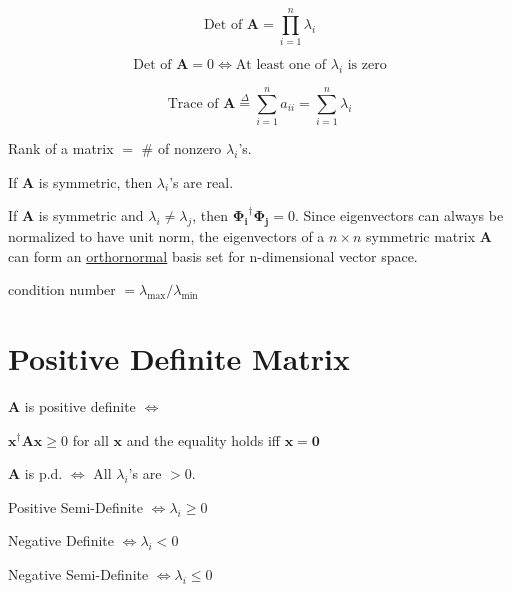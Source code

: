 \documentclass[fleqn]{article}
\begin{document}
	\begin{equation*}
		\text{Det of }\mathbf{A} = \prod_{i=1}^{n}{\lambda_i}
	\end{equation*}
	
	\begin{equation*}
		\text{Det of }\mathbf{A} = 0 \Leftrightarrow \text{At least one of }\lambda_i\text{ is zero}
	\end{equation*}
	
	\begin{equation*}
		\text{Trace of }\mathbf{A} \overset{\Delta}{=} \sum_{i=1}^{n}a_{ii} = \sum_{i=1}^{n}\lambda_i
	\end{equation*}
	
	Rank of a matrix $ = $ \# of nonzero $\lambda_i$'s.
	
	If $\mathbf{A}$ is symmetric, then $\lambda_i$'s are real.
	
	If $\mathbf{A}$ is symmetric and $\lambda_i \neq \lambda_j$, then $\mathbf{\Phi_i}^{\dag}\mathbf{\Phi_j} = 0$. Since eigenvectors can always be normalized to have unit norm, the eigenvectors of a $n \times n$ symmetric matrix $\mathbf{A}$ can form an \underline{orthornormal} basis set for n-dimensional vector space.
	
	condition number $ = \lambda_{\text{max}}/\lambda_{\text{min}}$
	
	\section{Positive Definite Matrix}
	
	$\mathbf{A}$ is positive definite $\Leftrightarrow$
	
	$\mathbf{x}^{\dag}\mathbf{A}\mathbf{x} \geq 0$ for all $\mathbf{x}$ and the equality holds iff $\mathbf{x} = \mathbf{0}$
	
	$\mathbf{A}$ is p.d. $\Leftrightarrow$ All $\lambda_i$'s are $ > 0$.
	
	Positive Semi-Definite $\Leftrightarrow \lambda_i \geq 0$
	
	Negative Definite $\Leftrightarrow \lambda_i < 0$
	
	Negative Semi-Definite $\Leftrightarrow \lambda_i \leq 0$
\end{document}
